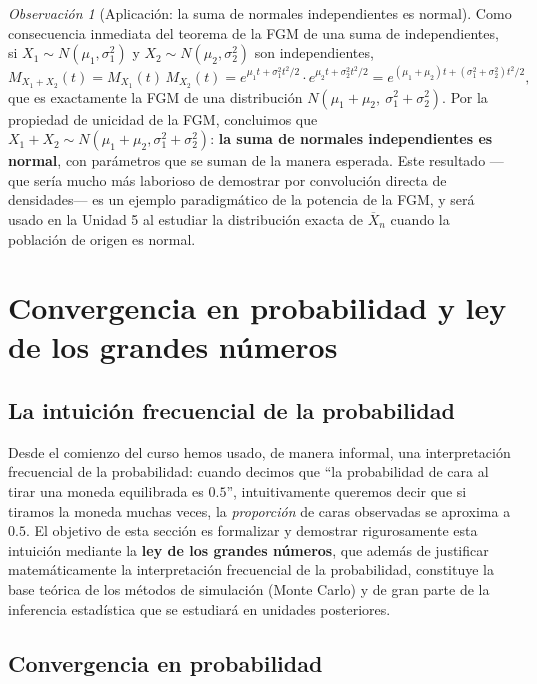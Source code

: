 \documentclass[11pt,a4paper]{article}
\theoremstyle{plain}
\theoremstyle{definition}
\theoremstyle{remark}
\newtheorem{observacion}[teorema]{Observación}
\begin{document}
\begin{observacion}[Aplicación: la suma de normales independientes es normal]
Como consecuencia inmediata del teorema de la FGM de una suma de independientes, si $X_1\sim N(\mu_1,\sigma_1^2)$ y $X_2\sim N(\mu_2,\sigma_2^2)$ son independientes,
\[
M_{X_1+X_2}(t) = M_{X_1}(t)\,M_{X_2}(t) = e^{\mu_1 t+\sigma_1^2t^2/2}\cdot e^{\mu_2t+\sigma_2^2t^2/2} = e^{(\mu_1+\mu_2)t + (\sigma_1^2+\sigma_2^2)t^2/2},
\]
que es exactamente la FGM de una distribución $N(\mu_1+\mu_2,\ \sigma_1^2+\sigma_2^2)$. Por la propiedad de unicidad de la FGM, concluimos que $X_1+X_2\sim N(\mu_1+\mu_2,\sigma_1^2+\sigma_2^2)$: \textbf{la suma de normales independientes es normal}, con parámetros que se suman de la manera esperada. Este resultado —que sería mucho más laborioso de demostrar por convolución directa de densidades— es un ejemplo paradigmático de la potencia de la FGM, y será usado en la Unidad 5 al estudiar la distribución exacta de $\overline{X}_n$ cuando la población de origen es normal.
\end{observacion}

\newpage
\section{Convergencia en probabilidad y ley de los grandes números}
\label{sec:lgn}

\subsection{La intuición frecuencial de la probabilidad}

Desde el comienzo del curso hemos usado, de manera informal, una interpretación frecuencial de la probabilidad: cuando decimos que ``la probabilidad de cara al tirar una moneda equilibrada es $0.5$'', intuitivamente queremos decir que si tiramos la moneda muchas veces, la \emph{proporción} de caras observadas se aproxima a $0.5$. El objetivo de esta sección es formalizar y demostrar rigurosamente esta intuición mediante la \textbf{ley de los grandes números}, que además de justificar matemáticamente la interpretación frecuencial de la probabilidad, constituye la base teórica de los métodos de simulación (Monte Carlo) y de gran parte de la inferencia estadística que se estudiará en unidades posteriores.

\subsection{Convergencia en probabilidad}
\end{document}
